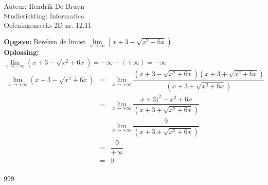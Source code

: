 \documentclass[a4paper]{article}
\begin{document}
  
\noindent \large Auteur: Hendrik De Bruyn \\
\noindent \large Studierichting: Informatica\\
\noindent \large Oefeningenreeks 2D nr. 12.11\\

\medskip

\normalsize

\textbf{Opgave:} Bereken de limiet $\lim\limits_{x \rightarrow \infty} (x + 3 - \sqrt{x^2 + 6x})$ \\

\textbf{Oplossing:} \\

$\lim\limits_{x \rightarrow -\infty} (x + 3 - \sqrt{x^2 + 6x}) = -\infty - (+\infty) = -\infty$ \\

$\begin{array}{rcl}
\lim\limits_{x \rightarrow +\infty} (x + 3 - \sqrt{x^2 + 6x}) 
    &=& \lim\limits_{x \rightarrow +\infty} \dfrac{(x + 3 - \sqrt{x^2 + 6x})(x + 3 + \sqrt{x^2 + 6x})}{(x + 3 + \sqrt{x^2 + 6x})} \\
    &=& \lim\limits_{x \rightarrow +\infty} \dfrac{x+3)^2 - x^2 + 6x}{(x + 3 + \sqrt{x^2 + 6x})} \\
    &=& \lim\limits_{x \rightarrow +\infty} \dfrac{9}{(x + 3 + \sqrt{x^2 + 6x})} \\
    &=& \dfrac{9}{+\infty} \\
    &=& 0 \\
\end{array}
$ \\

\begin{thebibliography}{999}
\end{thebibliography}
\end{document}
